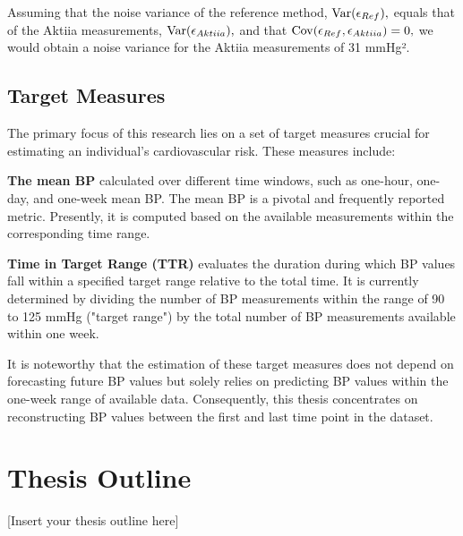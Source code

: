Assuming that the noise variance of the reference method, $\operatorname{Var}(\epsilon_{Ref}),$
equals that of the Aktiia measurements, $\operatorname{Var}(\epsilon_{Aktiia}),$ and that
$\operatorname{Cov}(\epsilon_{Ref}, \epsilon_{Aktiia})=0,$ we would obtain a noise variance for the Aktiia
measurements of 31 mmHg².

\subsection{Target Measures}\label{subsec:target-measures}

The primary focus of this research lies on a set of target measures crucial for
estimating an individual's cardiovascular risk. These measures include:

\textbf{The mean BP} calculated over different time windows, such as one-hour,
one-day, and one-week mean BP. The mean BP is a pivotal and frequently reported
metric. Presently, it is computed based on the available measurements within the
corresponding time range.

\textbf{Time in Target Range (TTR)} evaluates the duration during which BP values
fall within a specified target range relative to the total time. It is currently
determined by dividing the number of BP measurements within the range of 90 to
125 mmHg ("target range") by the total number of BP measurements available
within one week.

It is noteworthy that the estimation of these target measures does not depend on
forecasting future BP values but solely relies on predicting BP values within the
one-week range of available data. Consequently, this thesis concentrates on
reconstructing BP values between the first and last time point in the dataset.

\section{Thesis Outline}

[Insert your thesis outline here]